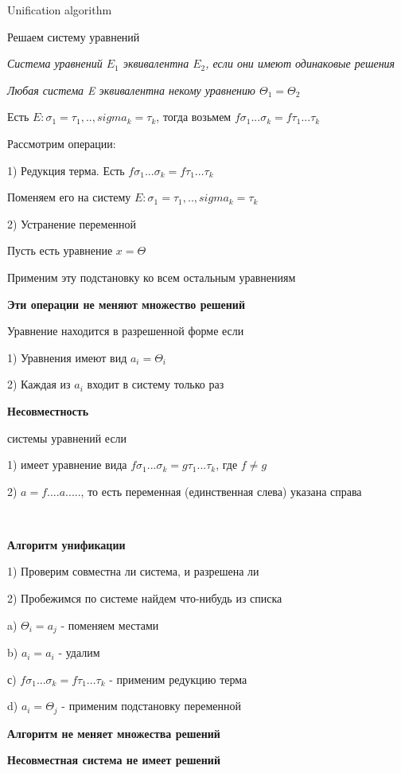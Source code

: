 \begin{para}{Unification algorithm}

Решаем систему уравнений

\textit{Система уравнений $E_1$ эквивалентна $E_2$, если они имеют одинаковые решения}

\textit{Любая система E эквивалентна некому уравнению $\Theta_1 = \Theta_2$}

Есть $E : \sigma_1 = \tau_1, .. ,sigma_k = \tau_k$, тогда возьмем $f \sigma_1 ... \sigma_k = f \tau_1 ... \tau_k$

Рассмотрим операции:

1) Редукция терма. Есть $f \sigma_1 ... \sigma_k = f \tau_1 ... \tau_k$

Поменяем его на систему $E : \sigma_1 = \tau_1, .. ,sigma_k = \tau_k$

2)  Устранение переменной

Пусть есть уравнение $x = \Theta$

Применим эту подстановку ко всем остальным уравнениям

\textbf{Эти операции не меняют множество решений}

Уравнение находится в разрешенной форме если

1) Уравнения имеют вид $a_i = \Theta_i$

2) Каждая из $a_i$ входит в систему только раз

\textbf{Несовместность}

системы уравнений если

1) имеет уравнение вида $f \sigma_1 ... \sigma_k = g \tau_1 ... \tau_k$, где $f \neq g$

2) $a = f .... a .....$, то есть переменная (единственная слева) указана справа

~\

\textbf{Алгоритм унификации}

1) Проверим совместна ли система, и разрешена ли

2) Пробежимся по системе найдем что-нибудь из списка

a) $\Theta_i = a_j$ - поменяем местами

b) $a_i = a_i$ - удалим

с) $f \sigma_1 ... \sigma_k = f \tau_1 ... \tau_k$ - применим редукцию терма

d) $a_i = \Theta_j$ - применим подстановку переменной

\textbf{Алгоритм не меняет множества решений}

\textbf{Несовместная система не имеет решений}


\end{para}
